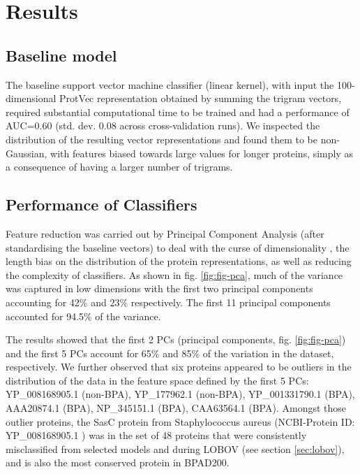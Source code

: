 \documentclass[10pt,journal,compsoc,twoside]{IEEEtran}
\begin{document}
\section{Results}
\label{sec:Results}

\subsection{Baseline model}
\label{sec:baseline}
The baseline support vector machine classifier (linear kernel), with input the 100-dimensional ProtVec representation obtained by summing the trigram vectors, required substantial computational time to be trained and had a performance of AUC=0.60 (std. dev. 0.08 across cross-validation runs). We inspected the distribution of the resulting vector representations and found them to be non-Gaussian, with features biased towards large values for longer proteins, simply as a consequence of having a larger number of trigrams.


\subsection{Performance of Classifiers}
\label{sec:model-selection}

Feature reduction was carried out by Principal Component Analysis (after standardising the baseline vectors)  to deal with the curse of dimensionality \cite{dynamic_programming}, the length bias on the distribution of the protein representations, as well as reducing the complexity of classifiers. As shown in fig. \ref{fig:fig-pca}, much of the variance was captured in low dimensions with the first two principal components accounting for 42\% and 23\% respectively. The first 11 principal components accounted for 94.5\% of the variance. 

The results showed that the first 2 PCs (principal components, fig. \ref{fig:fig-pca}) and the first 5 PCs account for 65\% and 85\% of the variation in the dataset, respectively. We further observed that six proteins appeared to be outliers in the distribution of the data in the feature space defined by the first 5 PCs: YP\_008168905.1 (non-BPA), YP\_177962.1 (non-BPA), YP\_001331790.1 (BPA), AAA20874.1 (BPA), NP\_345151.1 (BPA), CAA63564.1 (BPA). Amongst those outlier proteins, the SasC protein from Staphylococcus aureus (NCBI-Protein ID: YP\_008168905.1 \cite{YP_008168905.1}) was in the set of 48 proteins that were consistently misclassified from selected models and during LOBOV (see section  \ref{sec:lobov}), and is also the most conserved protein in BPAD200.
\end{document}
